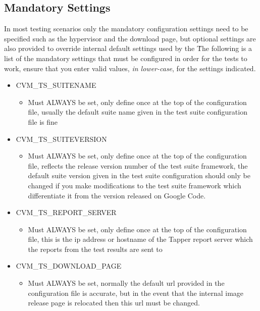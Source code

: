 \subsection{Mandatory Settings}
\label{sct:mandatorysettings}

In most testing scenarios only the mandatory configuration settings need to be specified such as the hypervisor and 
the download page, but optional settings are also provided to override internal default settings used by the 
\cernvmtestframework\. The following is a list of the mandatory settings that must be configured in order for the
tests to work, ensure that you enter valid values, \emph{in lower-case}, for the settings indicated.




\begin{itemize}
\item	CVM\_TS\_SUITENAME
		\begin{itemize}
		\item	Must ALWAYS be set, only define once at the top of the configuration file, 
	  		  	usually the default suite name given in the test suite configuration file is fine
		\end{itemize}
	  		  
\item	CVM\_TS\_SUITEVERSION
		\begin{itemize}
		\item	Must ALWAYS be set, only define once at the top of the configuration file,
	  		  	reflects the release version number of the test suite framework, the default 
      		  	suite version given in the test suite configuration should only be changed if 
     		  	you make modifications to the test suite framework which differentiate it from
      		  	the version released on Google Code.
		\end{itemize}

\item	CVM\_TS\_REPORT\_SERVER
		\begin{itemize}
		\item	Must ALWAYS be set, only define once at the top of the configuration file,
      			this is the ip address or hostname of the Tapper report server which the reports
      			from the test results are sent to
		\end{itemize}
		
\item	CVM\_TS\_DOWNLOAD\_PAGE
		\begin{itemize}
		\item	Must ALWAYS be set, normally the default url provided in the configuration file is
				accurate, but in the event that the internal \cernvm image release page is relocated
				then this url must be changed.
		\end{itemize}


\end{itemize}
